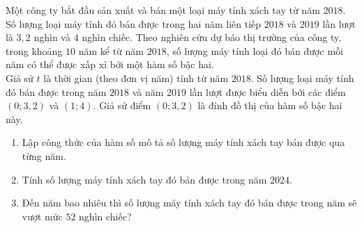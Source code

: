 \begin{bt}%
	Một công ty bắt đầu sản xuất và bán một loại máy tính xách tay từ năm $2018$. Số lượng loại máy tính đó bán được trong hai năm liên tiếp $2018$ và $2019$ lần lượt là $3{,}2$ nghìn và $4$ nghìn chiếc. Theo nghiên cứu dự báo thị trường của công ty, trong khoảng $10$ năm kể từ năm $2018$, số lượng máy tính loại đó bán được mỗi năm có thể được xấp xỉ bởi một hàm số bậc hai.\\
	Giả sử $t$ là thời gian (theo đơn vị năm) tính từ năm $2018$. Số lượng loại máy tính đó bán được trong năm $2018$ và năm $2019$ lần lượt được biểu diễn bởi các điểm $(0; 3{,}2)$ và $(1; 4)$. Giả sử điểm $(0; 3{,}2)$ là đỉnh đồ thị của hàm số bậc hai này.
	\begin{enumerate}
		\item Lập công thức của hàm số mô tả số lượng máy tính xách tay bán được qua từng năm.
		\item Tính số lượng máy tính xách tay đó bán được trong năm $2024$.
		\item Đến năm bao nhiêu thì số lượng máy tính xách tay đó bán được trong năm sẽ vượt mức $52$ nghìn chiếc?
	\end{enumerate}
\end{bt}

